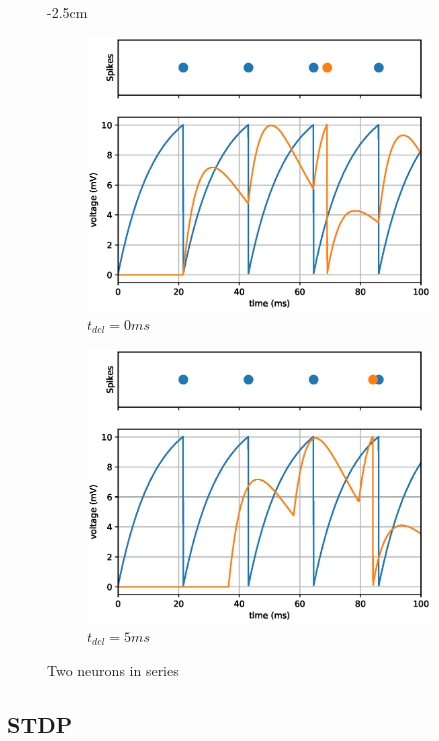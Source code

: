 \begin{figure}[h!]
    \addtolength{\leftskip} {-2.5cm}
    \addtolength{\rightskip}{-2.5cm}
    \begin{subfigure}{.65\textwidth}
        \centering
        \includegraphics[width=1\linewidth]{figures/graphs/twospikingneuronsnodelay.eps}
        \caption{$t_{del} = 0ms$}
        \label{fig:LIFDUAL0DEL}
    \end{subfigure}%
    \begin{subfigure}{.65\textwidth}
        \centering
        \includegraphics[width=1\linewidth]{figures/graphs/twospikingneuronsdelay.eps}
        \caption{$t_{del} = 5ms$}
        \label{fig:LIFDUALBUGDEL}
    \end{subfigure}
    \caption{Two neurons in series}
    \label{fig:LIFDUAL}
\end{figure}


\subsection{STDP}

